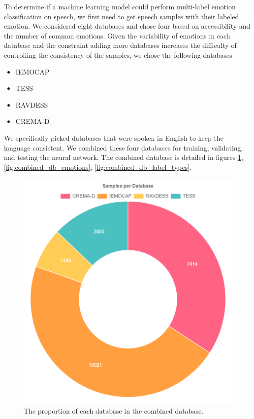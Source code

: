 \documentclass[conference]{IEEEtran}
\begin{document}
To determine if a machine learning model could perform multi-label emotion classification on speech, we first need to get speech samples with their labeled emotion. We considered eight databases and chose four based on accessibility and the number of common emotions. Given the variability of emotions in each database and the constraint adding more databases increases the difficulty of controlling the consistency of the samples, we chose the following databases
\begin{itemize}
	\item IEMOCAP \cite{busso_2008}
	\item TESS \cite{dupuis_2011}
	\item RAVDESS \cite{livingstone_2018}
	\item CREMA-D \cite{cao_2014}
\end{itemize}

We specifically picked databases that were spoken in English to keep the language consistent. We combined these four databases for training, validating, and testing the neural network. The combined database is detailed in figures \ref{fig:combined_db_db_split}, \ref{fig:combined_db_emotions}, \ref{fig:combined_db_label_types}.

\begin{figure}[h!]
	\centering
	\hspace{6mm}
	\includegraphics[width=\linewidth]{combined_db_db_split.png} 
	\caption{The proportion of each database in the combined database.}
	\label{fig:combined_db_db_split}
\end{figure}
\end{document}
